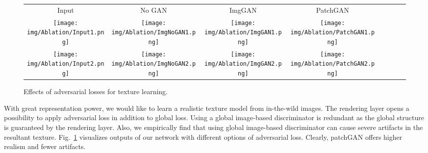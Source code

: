 \begin{figure}[t!]
\begin{center}
\small
\setlength{\tabcolsep}{3pt}
\begin{tabular}{c@{\hskip 1.5mm}c@{\hskip 1mm}c@{\hskip 1.5mm}c@{\hskip 1mm}c@{\hskip 1.5mm}c@{\hskip 1mm}c@{\hskip 1mm}c@{}}
Input & No GAN & ImgGAN& PatchGAN \\
\texttt{[image: img/Ablation/Input1.png]} &
\texttt{[image: img/Ablation/ImgNoGAN1.png]} &
\texttt{[image: img/Ablation/ImgGAN1.png]} &
\texttt{[image: img/Ablation/PatchGAN1.png]} &
\\
\texttt{[image: img/Ablation/Input2.png]} &
\texttt{[image: img/Ablation/ImgNoGAN2.png]} &
\texttt{[image: img/Ablation/ImgGAN2.png]} &
\texttt{[image: img/Ablation/PatchGAN2.png]} &
\end{tabular}
\vspace{-2mm}
\caption{\small Effects of adversarial losses for texture learning.}
\label{fig:abl_tex}
\figvspace \vspace{-2mm}
\end{center}
\end{figure}

With great representation power, we would like to learn a realistic texture model from in-the-wild images. 
The rendering layer opens a possibility to apply adversarial loss in addition to global  loss. 
Using a global image-based discriminator is redundant as the global structure is guaranteed by the rendering layer. 
Also, we empirically find that using global image-based discriminator can cause severe artifacts in the resultant texture. 
Fig.~\ref{fig:abl_tex} visualizes outputs of our network with different options of adversarial loss. 
Clearly, patchGAN offers higher realism and fewer artifacts.
